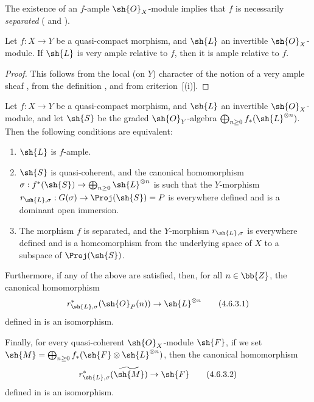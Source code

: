 The existence of an $f$-ample $\sh{O}_X$-module implies that $f$ is necessarily \emph{separated} ( and ).

\begin{proposition}[4.6.2]
\label{II.4.6.2}
Let $f: X\to Y$ be a quasi-compact morphism, and $\sh{L}$ an invertible $\sh{O}_X$-module.
If $\sh{L}$ is very ample relative to $f$, then it is ample relative to $f$.
\end{proposition}

\begin{proof}
This follows from the local (on $Y$) character of the notion of a very ample sheaf , from the definition , and from criterion~[(i)].
\end{proof}

\begin{proposition}[4.6.3]
\label{II.4.6.3}
Let $f: X\to Y$ be a quasi-compact morphism, and $\sh{L}$ an invertible $\sh{O}_X$-module, and let $\sh{S}$ be the graded $\sh{O}_Y$-algebra $\bigoplus_{n\geq0}f_*(\sh{L}^{\otimes n})$.
Then the following conditions are equivalent:
\begin{enumerate}
  \item[\rm{(a)}] $\sh{L}$ is $f$-ample.
  \item[\rm{(b)}] $\sh{S}$ is quasi-coherent, and the canonical homomorphism $\sigma:f^*(\sh{S})\to\bigoplus_{n\geq0}\sh{L}^{\otimes n}$  is such that the $Y$-morphism $r_{\sh{L},\sigma}:G(\sigma)\to\Proj(\sh{S})=P$ is everywhere defined and is a dominant open immersion.
  \item[\rm{(b')}] The morphism $f$ is separated, and the $Y$-morphism $r_{\sh{L},\sigma}$ is everywhere defined and is a homeomorphism from the underlying space of $X$ to a subspace of $\Proj(\sh{S})$.
\end{enumerate}

Furthermore, if any of the above are satisfied, then, for all $n\in\bb{Z}$, the canonical homomorphism
\[
\label{II.4.6.3.1}
  r_{\sh{L},\sigma}^*(\sh{O}_P(n)) \to \sh{L}^{\otimes n}
\tag{4.6.3.1}
\]
defined in  is an isomorphism.

Finally, for every quasi-coherent $\sh{O}_X$-module $\sh{F}$, if we set $\sh{M}=\bigoplus_{n\geq0}f_*(\sh{F}\otimes\sh{L}^{\otimes n})$, then the canonical homomorphism
\[
\label{II.4.6.3.2}
  r_{\sh{L},\sigma}^*(\widetilde{\sh{M}}) \to \sh{F}
\tag{4.6.3.2}
\]
defined in  is an isomorphism.
\end{proposition}

